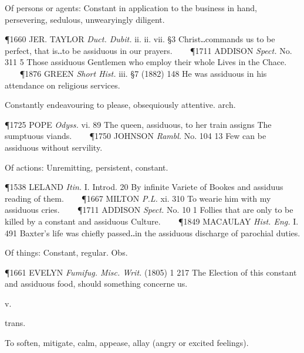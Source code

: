 \begin{description}[wide, labelwidth=!, labelindent=0pt]
\begin{myenumerate}

 Of persons or agents: Constant in application to the business in hand, persevering, sedulous, unwearyingly diligent.

\P 1660 JER.  TAYLOR \textit{Duct. Dubit.} ii. ii. vii. §3 Christ‥commands us to be perfect, that is‥to be assiduous in our prayers.    
\P 1711 ADDISON  \textit{Spect.} No. 311 5 Those assiduous Gentlemen who employ their whole Lives in the Chace.    
\P 1876 GREEN  \textit{Short Hist.} iii. §7 (1882) 148 He was assiduous in his attendance on religious services.

 Constantly endeavouring to please, obsequiously attentive. arch.

\P 1725 POPE  \textit{Odyss.} vi. 89 The queen, assiduous, to her train assigns The sumptuous viands.    
\P 1750 JOHNSON  \textit{Rambl.} No. 104 13 Few can be assiduous without servility.

 Of actions: Unremitting, persistent, constant.

\P 1538 LELAND  \textit{Itin.} I. Introd. 20 By infinite Variete of Bookes and assiduus reading of them.    
\P 1667 MILTON  \textit{P.L.} xi. 310 To wearie him with my assiduous cries.    
\P 1711 ADDISON  \textit{Spect.} No. 10 1 Follies that are only to be killed by a constant and assiduous Culture.    
\P 1849 MACAULAY  \textit{Hist. Eng.} I. 491 Baxter's life was chiefly passed‥in the assiduous discharge of parochial duties.

 Of things: Constant, regular. Obs.

\P 1661 EVELYN  \textit{Fumifug. Misc. Writ.} (1805) 1 217 The Election of this constant and assiduous food, should something concerne us.
\end{myenumerate}


 v.

\noindent {}

\vspace{-0.3cm}

\begin{myenumerate}

 trans.

 To soften, mitigate, calm, appease, allay (angry or excited feelings).


\end{myenumerate}
\end{description}
